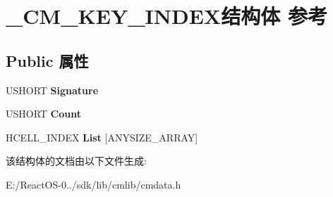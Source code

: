 \hypertarget{struct___c_m___k_e_y___i_n_d_e_x}{}\section{\+\_\+\+C\+M\+\_\+\+K\+E\+Y\+\_\+\+I\+N\+D\+E\+X结构体 参考}
\label{struct___c_m___k_e_y___i_n_d_e_x}
\subsection*{Public 属性}
\begin{DoxyCompactItemize}
\item 
\mbox{\label{struct___c_m___k_e_y___i_n_d_e_x_aaa89d1f5eda6bb1c33e7b652a5fa44dd}} 
U\+S\+H\+O\+RT {\bfseries Signature}
\item 
\mbox{\label{struct___c_m___k_e_y___i_n_d_e_x_abbeb0d39d668f37999fae42cf322dac7}} 
U\+S\+H\+O\+RT {\bfseries Count}
\item 
\mbox{\label{struct___c_m___k_e_y___i_n_d_e_x_af2448554a13e382978237917391c13ec}} 
H\+C\+E\+L\+L\+\_\+\+I\+N\+D\+EX {\bfseries List} \mbox{[}A\+N\+Y\+S\+I\+Z\+E\+\_\+\+A\+R\+R\+AY\mbox{]}
\end{DoxyCompactItemize}


该结构体的文档由以下文件生成\+:\begin{DoxyCompactItemize}
\item 
E\+:/\+React\+O\+S-\/0../sdk/lib/cmlib/cmdata.\+h\end{DoxyCompactItemize}
